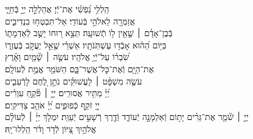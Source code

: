 \documentclass[twoside, openany, parskip=half, 11pt]{book}
\begin{document}
\negline

\ashrei


\begin{narrow}

\hfill \break
הַֽלְלִ֥י נַ֝פְשִׁ֗י אֶת־יְֿיָ׃ \hfill
אֲהַלְלָ֣ה יְיָ֣ בְּֿחַיָּ֑י \\ אֲזַמְּרָ֖ה לֵאלֹהַ֣י בְּֿעוֹדִֽי׃ \hfill
אַל־תִּבְטְח֥וּ בִנְדִיבִ֑ים \\ בְּֿבֶן־אָדָ֓ם ׀ שֶׁ֤אֵ֖ין ל֥וֹ תְֿשׁוּעָֽה׃ \hfill
תֵּצֵ֣א ר֭וּחוֹ יָשֻׁ֣ב לְֿאַדְמָת֑וֹ \\ בַּיּ֥וֹם הַ֝ה֗וּא אָבְֿד֥וּ עֶשְׁתֹּֽנֹתָֽיו׃ \hfill
אַשְׁרֵ֗י שֶׁ֤אֵ֣ל יַעֲקֹ֣ב בְּֿעֶזְר֑וֹ\\ שִׂ֝בְר֗וֹ עַל־יְֿיָ֥ אֱלֹהָֽיו׃ \hfill
עֹשֶׂ֤ה ׀ שָׁ֘מַ֤יִם וָאָ֗רֶץ \\ אֶת־הַיָּ֥ם וְֿאֶת־כׇּל־אֲשֶׁר־בָּ֑ם \hfill הַשֹּׁמֵ֖ר אֱמֶ֣ת לְֿעוֹלָֽם׃\\
עֹשֶׂ֤ה מִשְׁפָּ֨ט ׀ לָעֲשׁוּקִ֗ים \hfill נֹתֵ֣ן לֶ֭חֶם לָרְֿעֵבִ֑ים \\ יְ֝יָ֗ מַתִּ֥יר אֲסוּרִֽים׃ \hfill
יְיָ֤ ׀ פֹּ֘קֵ֤חַ עִוְרִ֗ים \\ יְיָ֭ זֹקֵ֣ף כְּֿפוּפִ֑ים \hfill יְ֝יָ֗ אֹהֵ֥ב צַדִּיקִֽים׃\\
יְיָ֤ ׀ שֹׁ֘מֵ֤ר אֶת־גֵּרִ֗ים יָת֣וֹם וְֿאַלְמָנָ֣ה יְֿעוֹדֵ֑ד וְֿדֶ֖רֶךְ רְֿשָׁעִ֣ים יְֿעַוֵּֽת׃ \hfill
יִמְלֹ֤ךְ יְיָ֨ ׀ לְֿעוֹלָ֗ם\\ אֱלֹהַ֣יִךְ צִ֭יּוֹן לְֿדֹ֥ר וָדֹ֗ר \hfill הַֽלְלוּ־יָֽהּ׃




\end{narrow}
\end{document}
